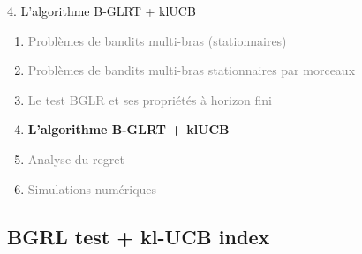 \documentclass[11pt,french,ignorenonframetext,]{beamer}
\begin{document}
\begin{frame}{4. L'algorithme B-GLRT + klUCB}

  \begin{enumerate}
    \item
    \textcolor{gray}{
      Problèmes de bandits multi-bras (stationnaires)
    }
    \vspace*{15pt}

    \item
    \textcolor{gray}{
      Problèmes de bandits multi-bras stationnaires par morceaux
    }
    \vspace*{15pt}

    \item
    \textcolor{gray}{
      Le test BGLR et ses propriétés à horizon fini
    }
    \vspace*{15pt}

    \item
    \alert{\textbf{%
      L'algorithme B-GLRT + klUCB
    }}
    \vspace*{15pt}

    \item
    \textcolor{gray}{
      Analyse du regret
    }
    \vspace*{15pt}

    \item
    \textcolor{gray}{
      Simulations numériques
    }
  \end{enumerate}

\end{frame}

\subsection{\hfill{}BGRL test + kl-UCB index\hfill{}}
\end{document}
